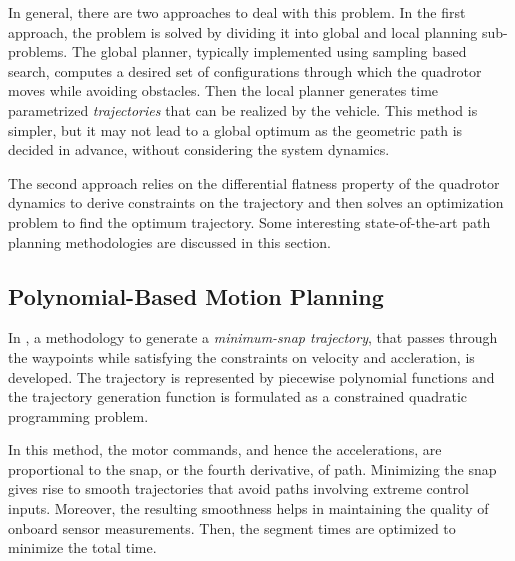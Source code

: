 In general, there are two approaches to deal with this problem. In the first approach, the problem is solved by dividing it into global and local planning sub-problems. The global planner, typically implemented using sampling based search, computes a desired set of configurations through which the quadrotor moves while avoiding obstacles. Then the local planner generates time parametrized \textit{trajectories} that can be realized by the vehicle. This method is simpler, but it may not lead to a global optimum as the geometric path is decided in advance, without considering the system dynamics. 

The second approach relies on the differential flatness \cite{mellinger2011minimum} property of the quadrotor dynamics to derive constraints on the trajectory and then solves an optimization problem to find the optimum trajectory. Some interesting state-of-the-art path planning methodologies are discussed in this section. 
\subsection{Polynomial-Based Motion Planning}
In \cite{mellinger2011minimum}, a methodology to generate a \textit{minimum-snap trajectory}, that passes through the waypoints while satisfying the constraints on velocity and accleration, is developed. The trajectory is represented by piecewise polynomial functions and the trajectory generation function is formulated as a constrained quadratic programming problem. 

In this method, the motor commands, and hence the accelerations, are proportional to the snap, or the fourth derivative, of path. Minimizing the snap gives rise to smooth trajectories that avoid paths involving extreme control inputs. Moreover, the resulting smoothness helps in maintaining the quality of onboard sensor measurements. Then, the segment times are optimized to minimize the total time. 




